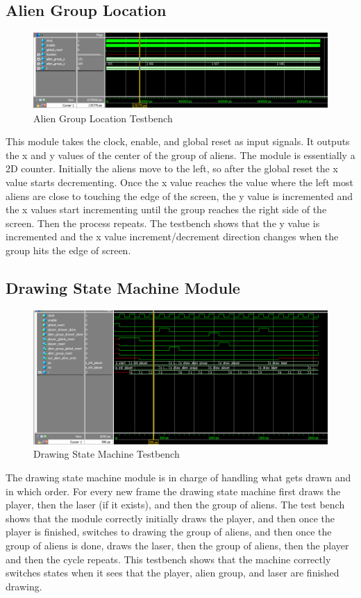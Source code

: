 \documentclass[11pt, titlepage]{article}
\begin{document}
        \subsection{Alien Group Location}
            \begin{figure}[H]
                \centering
                \includegraphics[scale = 0.53]{Images/Testbench Alien Group Location.png}
                \caption{Alien Group Location Testbench}
            \end{figure}
            This module takes the clock, enable, and global reset as input signals. It outputs the x and y values of the center of the group of aliens. The module is essentially a 2D counter. Initially the aliens move to the left, so after the global reset the x value starts decrementing. Once the x value reaches the value where the left most aliens are close to touching the edge of the screen, the y value is incremented and the x values start incrementing until the group reaches the right side of the screen. Then the process repeats. The testbench shows that the y value is incremented and the x value increment/decrement direction changes when the group hits the edge of screen.
        \subsection{Drawing State Machine Module}
            \begin{figure}[H]
                \centering
                \includegraphics[scale = 0.53]{Images/Testbench Drawing State Machine.png}
                \caption{Drawing State Machine Testbench}
            \end{figure}
            The drawing state machine module is in charge of handling what gets drawn and in which order. For every new frame the drawing state machine first draws the player, then the laser (if it exists), and then the group of aliens. The test bench shows that the module correctly initially draws the player, and then once the player is finished, switches to drawing the group of aliens, and then once the group of aliens is done, draws the laser, then the group of aliens, then the player and then the cycle repeats. This testbench shows that the machine correctly switches states when it sees that the player, alien group, and laser are finished drawing.
\end{document}
